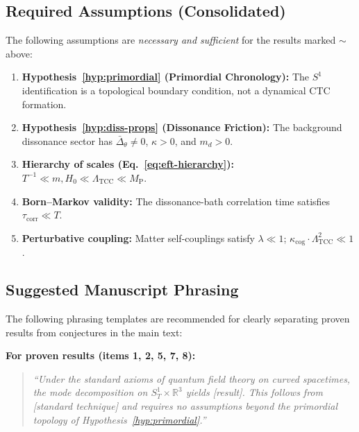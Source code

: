 \documentclass[12pt,openany]{book}
\theoremstyle{plain}
\theoremstyle{definition}
\theoremstyle{remark}
\begin{document}
\subsection*{Required Assumptions (Consolidated)}

The following assumptions are \emph{necessary and sufficient} for
the results marked $\boldsymbol{\sim}$ above:

\begin{enumerate}
  \item \textbf{Hypothesis~\ref{hyp:primordial} (Primordial Chronology):}
    The $S^{1}$ identification is a topological boundary condition,
    not a dynamical CTC formation.

  \item \textbf{Hypothesis~\ref{hyp:diss-props} (Dissonance Friction):}
    The background dissonance sector has $\bar{\Delta}_{\theta} \neq 0$,
    $\kappa > 0$, and $m_{d} > 0$.

  \item \textbf{Hierarchy of scales (Eq.~\ref{eq:eft-hierarchy}):}
    $T^{-1} \ll m, H_{0} \ll \Lambda_{\mathrm{TCC}} \ll M_{\mathrm{P}}$.

  \item \textbf{Born--Markov validity:}
    The dissonance-bath correlation time satisfies
    $\tau_{\mathrm{corr}} \ll T$.

  \item \textbf{Perturbative coupling:}
    Matter self-couplings satisfy $\lambda \ll 1$;
    $\kappa_{\mathrm{cog}} \cdot \Lambda_{\mathrm{TCC}}^{2}
    \ll 1$.
\end{enumerate}


\subsection*{Suggested Manuscript Phrasing}

\noindent
The following phrasing templates are recommended for clearly
separating proven results from conjectures in the main text:

\medskip
\noindent
\textbf{For proven results (items 1, 2, 5, 7, 8):}
\begin{quote}
\itshape
``Under the standard axioms of quantum field theory on curved
spacetimes, the mode decomposition on $S^{1}_{T}\times\mathbb{R}^{3}$
yields [result].  This follows from [standard technique] and requires
no assumptions beyond the primordial topology of
Hypothesis~\ref{hyp:primordial}.''
\end{quote}
\end{document}
